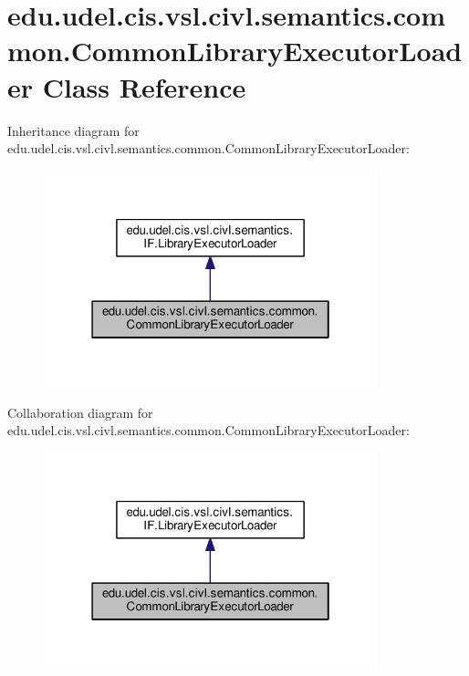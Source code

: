 \hypertarget{classedu_1_1udel_1_1cis_1_1vsl_1_1civl_1_1semantics_1_1common_1_1CommonLibraryExecutorLoader}{}\section{edu.\+udel.\+cis.\+vsl.\+civl.\+semantics.\+common.\+Common\+Library\+Executor\+Loader Class Reference}
\label{classedu_1_1udel_1_1cis_1_1vsl_1_1civl_1_1semantics_1_1common_1_1CommonLibraryExecutorLoader}


Inheritance diagram for edu.\+udel.\+cis.\+vsl.\+civl.\+semantics.\+common.\+Common\+Library\+Executor\+Loader\+:
\nopagebreak
\begin{figure}[H]
\begin{center}
\leavevmode
\includegraphics[width=274pt]{classedu_1_1udel_1_1cis_1_1vsl_1_1civl_1_1semantics_1_1common_1_1CommonLibraryExecutorLoader__inherit__graph}
\end{center}
\end{figure}


Collaboration diagram for edu.\+udel.\+cis.\+vsl.\+civl.\+semantics.\+common.\+Common\+Library\+Executor\+Loader\+:
\nopagebreak
\begin{figure}[H]
\begin{center}
\leavevmode
\includegraphics[width=274pt]{classedu_1_1udel_1_1cis_1_1vsl_1_1civl_1_1semantics_1_1common_1_1CommonLibraryExecutorLoader__coll__graph}
\end{center}
\end{figure}
